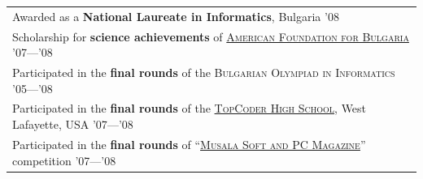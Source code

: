 \documentclass[a4paper,10pt]{article}
\begin{document}
{\hspace{3mm}\begin{tabular}{@{•\enskip}p{14.5cm}}
	Awarded as a \textbf{National Laureate in Informatics}, Bulgaria \textsc{'08}\\
        Scholarship for \textbf{science achievements} of \href{http://www.afbulgaria.org/}{\textsc{American Foundation for Bulgaria}} \textsc{'07}---\textsc{'08}\\
	Participated in the \textbf{final rounds} of the \textsc{Bulgarian Olympiad in Informatics} \textsc{'05}---\textsc{'08}\\
        Participated in the \textbf{final rounds} of the \href{http://community.topcoder.com/tc?module=Static&d1=tournaments&d2=home}{\textsc{TopCoder High School}}, West Lafayette, USA \textsc{'07}---\textsc{'08}\\
        Participated in the \textbf{final rounds} of ``\href{http://konkurs.musala.com/}{\textsc{Musala Soft and PC Magazine}}'' competition \textsc{'07}---\textsc{'08}\\
\end{tabular}



}
\end{document}
